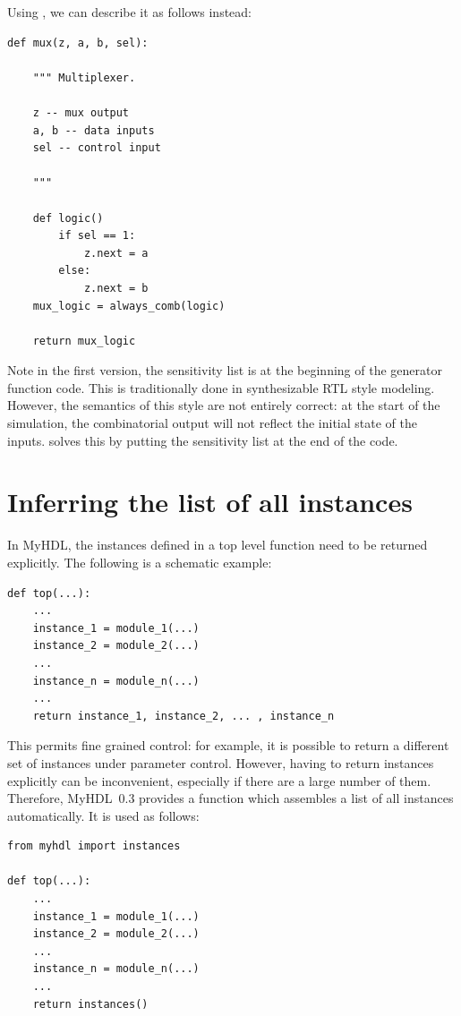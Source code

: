 \documentclass{howto}
\newcommand{\myhdl}{\protect \mbox{MyHDL}}
\begin{document}
Using , we can describe it as follows instead:

\begin{verbatim}
def mux(z, a, b, sel):

    """ Multiplexer.
    
    z -- mux output
    a, b -- data inputs
    sel -- control input

    """

    def logic()
        if sel == 1:
            z.next = a
        else:
            z.next = b
    mux_logic = always_comb(logic)

    return mux_logic
\end{verbatim}

Note in the first version, the sensitivity list is at the beginning of
the generator function code. This is traditionally done in
synthesizable RTL style modeling. However, the semantics of this style
are not entirely correct: at the start of the simulation, the
combinatorial output will not reflect the initial state of the
inputs.  solves this by putting the sensitivity
list at the end of the code.

\section{Inferring the list of all instances\label{section-instances}}

In \myhdl{}, the instances defined in a top level function
need to be returned explicitly. The following is a schematic
example:

\begin{verbatim}
def top(...):
    ...
    instance_1 = module_1(...)
    instance_2 = module_2(...)
    ...
    instance_n = module_n(...)
    ... 
    return instance_1, instance_2, ... , instance_n
\end{verbatim}


This permits fine grained control: for example, it
is possible to return a different set of instances
under parameter control. 
However, having to return instances explicitly can be inconvenient,
especially if there are a large number of them. Therefore, \myhdl\ 0.3
provides a function  which assembles a list of
all instances automatically. It is used as follows:

\begin{verbatim}
from myhdl import instances

def top(...):
    ...
    instance_1 = module_1(...)
    instance_2 = module_2(...)
    ...
    instance_n = module_n(...)
    ...
    return instances()
\end{verbatim}
\end{document}
